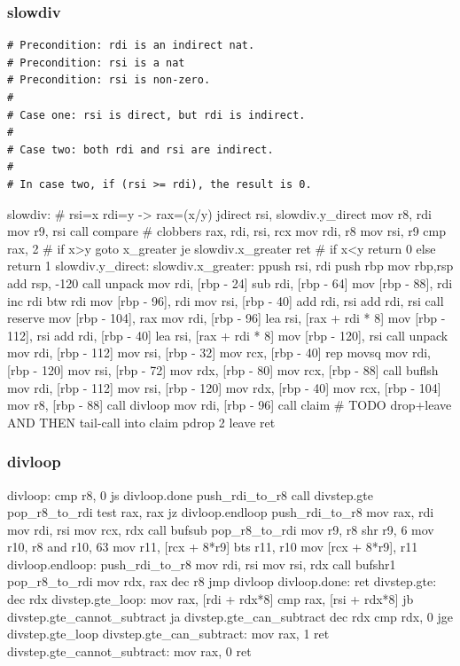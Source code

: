 \subsubsection{slowdiv}

\begin{verbatim}
# Precondition: rdi is an indirect nat.
# Precondition: rsi is a nat
# Precondition: rsi is non-zero.
#
# Case one: rsi is direct, but rdi is indirect.
#
# Case two: both rdi and rsi are indirect.
#
# In case two, if (rsi >= rdi), the result is 0.
\end{verbatim}

\begin{asm}
slowdiv: # rsi=x rdi=y -> rax=(x/y)
	jdirect	rsi, slowdiv.y_direct
	mov	r8, rdi
	mov	r9, rsi
	call	compare    # clobbers rax, rdi, rsi, rcx
	mov	rdi, r8
	mov	rsi, r9
	cmp	rax, 2     # if x>y goto x_greater
	je	slowdiv.x_greater
	ret                # if x<y return 0 else return 1
slowdiv.y_direct:
slowdiv.x_greater:
	ppush	rsi, rdi
	push	rbp
	mov	rbp,rsp
	add	rsp, -120
	call	unpack
	mov	rdi, [rbp - 24]
	sub	rdi, [rbp - 64]
	mov	[rbp - 88], rdi
	inc	rdi
	btw	rdi
	mov	[rbp - 96], rdi
	mov	rsi, [rbp - 40]
	add	rdi, rsi
	add	rdi, rsi
	call	reserve
	mov	[rbp - 104], rax
	mov	rdi, [rbp - 96]
	lea	rsi, [rax + rdi * 8]
	mov	[rbp - 112], rsi
	add	rdi, [rbp - 40]
	lea	rsi, [rax + rdi * 8]
	mov	[rbp - 120], rsi
	call	unpack
	mov	rdi, [rbp - 112]
	mov	rsi, [rbp - 32]
	mov	rcx, [rbp - 40]
	rep	movsq
	mov	rdi, [rbp - 120]
	mov	rsi, [rbp - 72]
	mov	rdx, [rbp - 80]
	mov	rcx, [rbp - 88]
	call	buflsh
	mov	rdi, [rbp - 112]
	mov	rsi, [rbp - 120]
	mov	rdx, [rbp - 40]
	mov	rcx, [rbp - 104]
	mov	r8, [rbp - 88]
	call	divloop
	mov	rdi, [rbp - 96]
	call	claim # TODO drop+leave AND THEN tail-call into claim
	pdrop	2
	leave
	ret
\end{asm}

\subsubsection{divloop}

\begin{asm}
divloop:
	cmp	r8, 0
	js	divloop.done
	push_rdi_to_r8
	call	divstep.gte
	pop_r8_to_rdi
	test	rax, rax
	jz	divloop.endloop
	push_rdi_to_r8
	mov	rax, rdi
	mov	rdi, rsi
	mov	rcx, rdx
	call	bufsub
	pop_r8_to_rdi
	mov	r9, r8
	shr	r9, 6
	mov	r10, r8
	and	r10, 63
	mov	r11, [rcx + 8*r9]
	bts	r11, r10
	mov	[rcx + 8*r9], r11
divloop.endloop:
	push_rdi_to_r8
	mov	rdi, rsi
	mov	rsi, rdx
	call	bufshr1
	pop_r8_to_rdi
	mov	rdx, rax
	dec	r8
	jmp	divloop
divloop.done:
	ret
divstep.gte:
	dec	rdx
divstep.gte_loop:
	mov	rax, [rdi + rdx*8]
	cmp	rax, [rsi + rdx*8]
	jb	divstep.gte_cannot_subtract
	ja	divstep.gte_can_subtract
	dec	rdx
	cmp	rdx, 0
	jge	divstep.gte_loop
divstep.gte_can_subtract:
	mov	rax, 1
	ret
divstep.gte_cannot_subtract:
	mov	rax, 0
	ret
\end{asm}

